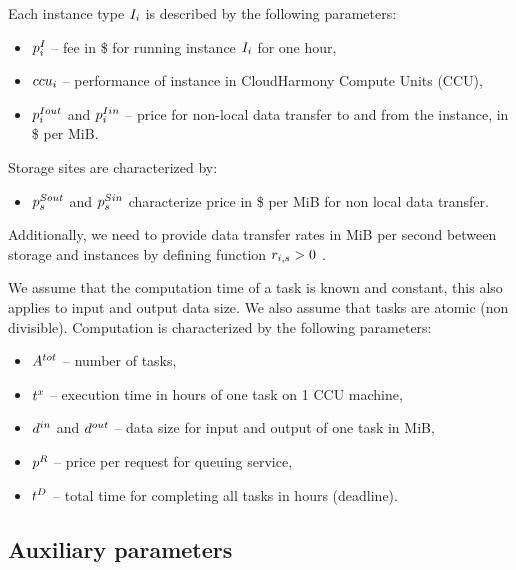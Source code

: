 {  Each instance type $I_i$ is described by the following parameters:
  \begin{itemize}
      \item $p^I_i$ -- fee in \$ for running instance $I_i$
      for one hour,
      \item $ccu_i$ -- performance of instance in CloudHarmony Compute Units
      (CCU),
      \item $p^{Iout}_i$ and $p^{Iin}_i$ --
      price for non-local data transfer to and from the instance, in \$ per
      MiB.
  \end{itemize}

  Storage sites are characterized by:
  \begin{itemize}
      \item $p^{Sout}_s$ and $p^{Sin}_s$
      characterize price in \$ per MiB for non local data transfer.
  \end{itemize}

  Additionally, we need to provide data transfer rates in MiB per second between storage and instances by defining function $r_{i,s} > 0$ .

  We assume that the computation time of a task is known and constant, this also applies to input and output data size. We also assume that tasks are atomic (non divisible). Computation is characterized by the following parameters:
  \begin{itemize}
      \item $A^{tot}$ -- number of tasks,
      \item $t^x$ -- execution time in hours of one task on 1 CCU
      machine,
      \item $d^{in}$ and $d^{out}$ -- data size for input and
      output of one task in MiB,
      \item $p^{R}$ -- price per request for queuing service,
      \item $t^D$ -- total time for completing all tasks in hours (deadline).
  \end{itemize} 

\subsection{Auxiliary parameters}

}
